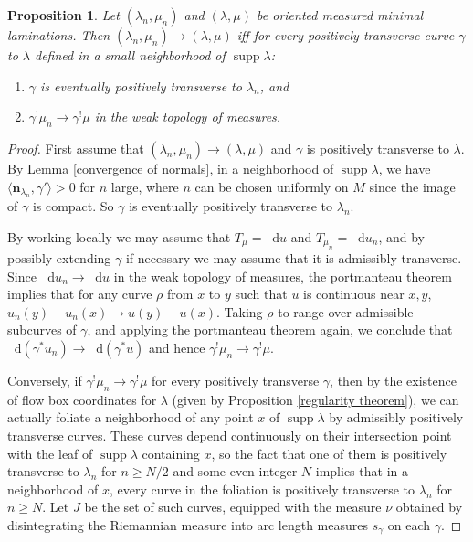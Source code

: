 \documentclass[reqno,11pt]{amsart}
\newcommand*\dif{\mathop{}\!\mathrm{d}}
\DeclareMathOperator{\supp}{supp}
\newcommand{\normal}{\mathbf n}
\newtheorem{proposition}[theorem]{Proposition}
\theoremstyle{definition}
\numberwithin{equation}{section}
\begin{document}
\begin{proposition}\label{characterization of measure convergence}
	Let $(\lambda_n, \mu_n)$ and $(\lambda, \mu)$ be oriented measured minimal laminations. Then $(\lambda_n, \mu_n) \to (\lambda, \mu)$ iff for every positively transverse curve $\gamma$ to $\lambda$ defined in a small neighborhood of $\supp \lambda$:
\begin{enumerate}
\item $\gamma$ is eventually positively transverse to $\lambda_n$, and 
\item $\gamma^! \mu_n \to \gamma^! \mu$ in the weak topology of measures.
\end{enumerate}
\end{proposition}
\begin{proof}
	First assume that $(\lambda_n, \mu_n) \to (\lambda, \mu)$ and $\gamma$ is positively transverse to $\lambda$.
	By Lemma \ref{convergence of normals}, in a neighborhood of $\supp \lambda$, we have $\langle \normal_{\lambda_n}, \gamma' \rangle > 0$ for $n$ large, where $n$ can be chosen uniformly on $M$ since the image of $\gamma$ is compact. So $\gamma$ is eventually positively transverse to $\lambda_n$.

	By working locally we may assume that $T_\mu = \dif u$ and $T_{\mu_n} = \dif u_n$, and by possibly extending $\gamma$ if necessary we may assume that it is admissibly transverse.
	Since $\dif u_n \to \dif u$ in the weak topology of measures, the portmanteau theorem implies that for any curve $\rho$ from $x$ to $y$ such that $u$ is continuous near $x, y$, $u_n(y) - u_n(x) \to u(y) - u(x)$.
	Taking $\rho$ to range over admissible subcurves of $\gamma$, and applying the portmanteau theorem again, we conclude that $\dif(\gamma^* u_n) \to \dif(\gamma^* u)$ and hence $\gamma^! \mu_n \to \gamma^! \mu$.

	Conversely, if $\gamma^! \mu_n \to \gamma^! \mu$ for every positively transverse $\gamma$, then by the existence of flow box coordinates for $\lambda$ (given by Proposition \ref{regularity theorem}), we can actually foliate a neighborhood of any point $x$ of $\supp \lambda$ by admissibly positively transverse curves.
	These curves depend continuously on their intersection point with the leaf of $\supp \lambda$ containing $x$, so the fact that one of them is positively transverse to $\lambda_n$ for $n \geq N/2$ and some even integer $N$ implies that in a neighborhood of $x$, every curve in the foliation is positively transverse to $\lambda_n$ for $n \geq N$.
	Let $J$ be the set of such curves, equipped with the measure $\nu$ obtained by disintegrating the Riemannian measure into arc length measures $s_\gamma$ on each $\gamma$.
	

\end{proof}
\end{document}
